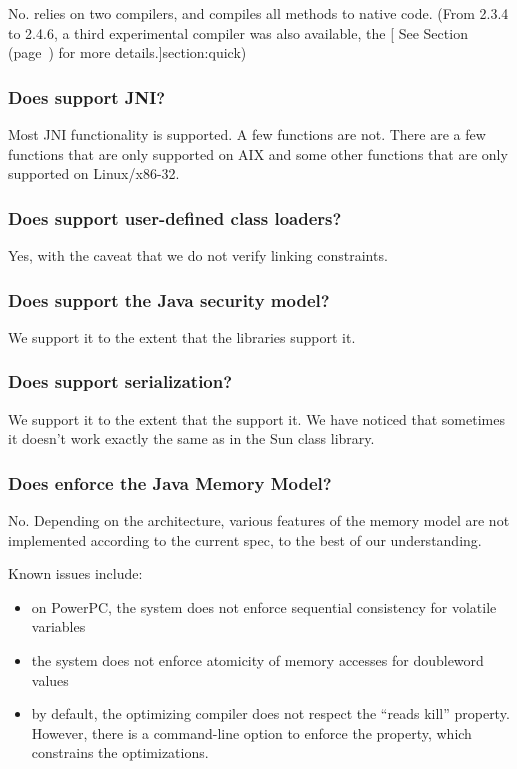 No.  \jrvm{} relies on two compilers, and compiles all methods to
native code.  (From \jrvm{} 2.3.4 to 2.4.6, a third experimental compiler was
also available, the [ See
Section~\Ref{} (page~\Pageref) for more details.]{section:quick})

\subsubsection{Does \jrvm{} support JNI?}

Most JNI functionality is supported. A few functions are not. 
There are a few functions that are only supported on AIX\TMweb{}
and some other functions that are only supported on Linux\Rweb{}/x86-32.

\subsubsection{Does \jrvm{} support user-defined class loaders?}
Yes, with the caveat that we do not verify linking constraints.

\subsubsection{Does \jrvm{} support the Java\TMheadingweb{} security model?} 

We support it to the extent that the 
libraries support it.

\subsubsection{Does \jrvm{} support serialization?}

We support it to the extent that the 
support it. We have noticed that sometimes it doesn't
work exactly the same as in the Sun\Rweb{} class library.

\subsubsection{Does \jrvm{} enforce the Java Memory Model?}

No. Depending on the architecture, various features of the memory model
are not implemented according to the current spec, to the best of our
understanding.

Known issues include:
\begin{itemize}
\item on PowerPC\TMweb{}, the system does not enforce
sequential consistency for volatile variables
\item the system does not enforce atomicity of memory accesses for
doubleword values
\item by default, the optimizing compiler does not respect the ``reads
kill'' property.  However, there is a command-line option to enforce the
property, which constrains the optimizations.
\end{itemize}

